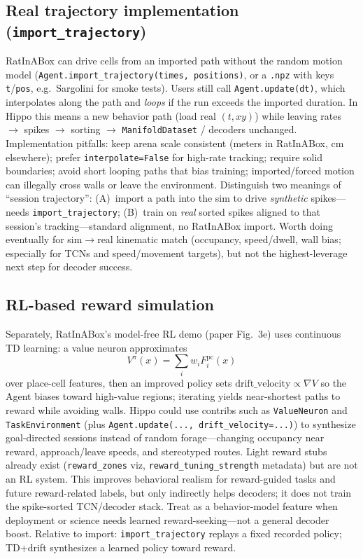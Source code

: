 \documentclass[11pt,a4paper]{article}
\begin{document}
\subsection{Real trajectory implementation (\texttt{import\_trajectory})}

RatInABox can drive cells from an imported path without the random motion model (\texttt{Agent.import\_trajectory(times, positions)}, or a \texttt{.npz} with keys \texttt{t}/\texttt{pos}, e.g.\ Sargolini for smoke tests).
Users still call \texttt{Agent.update(dt)}, which interpolates along the path and \emph{loops} if the run exceeds the imported duration.
In Hippo this means a new behavior path (load real $(t, xy)$) while leaving rates $\rightarrow$ spikes $\rightarrow$ sorting $\rightarrow$ \texttt{ManifoldDataset} / decoders unchanged.
Implementation pitfalls: keep arena scale consistent (meters in RatInABox, cm elsewhere); prefer \texttt{interpolate=False} for high-rate tracking; require solid boundaries; avoid short looping paths that bias training; imported/forced motion can illegally cross walls or leave the environment.
Distinguish two meanings of ``session trajectory'': (A)~import a path into the sim to drive \emph{synthetic} spikes---needs \texttt{import\_trajectory}; (B)~train on \emph{real} sorted spikes aligned to that session's tracking---standard alignment, no RatInABox import.
Worth doing eventually for sim$\rightarrow$real kinematic match (occupancy, speed/dwell, wall bias; especially for TCNs and speed/movement targets), but not the highest-leverage next step for decoder success.

\subsection{RL-based reward simulation}

Separately, RatInABox's model-free RL demo (paper Fig.~3e) uses continuous TD learning: a value neuron approximates
\begin{equation*}
  V^{\pi}(x)=\sum_i w_i F^{\mathrm{pc}}_i(x)
\end{equation*}
over place-cell features, then an improved policy sets $\mathrm{drift\_velocity} \propto \nabla V$ so the Agent biases toward high-value regions; iterating yields near-shortest paths to reward while avoiding walls.
Hippo could use contribs such as \texttt{ValueNeuron} and \texttt{TaskEnvironment} (plus \texttt{Agent.update(..., drift\_velocity=...)}) to synthesize goal-directed sessions instead of random forage---changing occupancy near reward, approach/leave speeds, and stereotyped routes.
Light reward stubs already exist (\texttt{reward\_zones} viz, \texttt{reward\_tuning\_strength} metadata) but are not an RL system.
This improves behavioral realism for reward-guided tasks and future reward-related labels, but only indirectly helps decoders; it does not train the spike-sorted TCN/decoder stack.
Treat as a behavior-model feature when deployment or science needs learned reward-seeking---not a general decoder boost.
Relative to import: \texttt{import\_trajectory} replays a fixed recorded policy; TD+drift synthesizes a learned policy toward reward.
\end{document}
